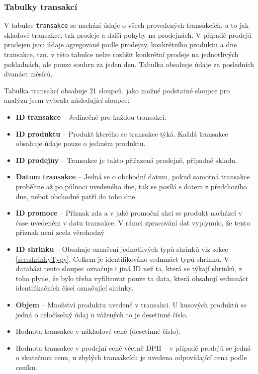 \subsubsection{Tabulky transakcí}
V tabulce \texttt{transakce} se nachází údaje o všech provedených transakcích, a to jak skladové transakce, tak prodeje a další pohyby na prodejnách. V případě prodejů prodejen jsou údaje agregované podle prodejny, konkrétního produktu a dne transakce, tzn. v této tabulce nelze rozlišit konkrétní prodeje na jednotlivých pokladnách, ale pouze souhrn za jeden den. Tabulka obsahuje údaje za posledních dvanáct měsíců.

Tabulka transakcí obsahuje 21 sloupců, jako možné podstatné sloupce pro analýzu jsem vybrala následující sloupce:

\begin{itemize}
    \itemsep0em
    \item \textbf{ID transakce} -- Jedinečné pro každou transakci.
    \item \textbf{ID produktu} -- Produkt kterého se transakce týká. Každá transakce obsahuje údaje pouze o jediném produktu. 
    \item \textbf{ID prodejny} -- Transakce je takto přiřazená prodejně, případně skladu. %
    \item \textbf{Datum transakce} -- Jedná se o obchodní datum, pokud samotná transakce proběhne až po půlnoci uvedeného dne, tak se posílá s datem z předchozího dne, neboť obchodně patří do toho dne.
    \item \textbf{ID promoce} -- Příznak zda a v jaké promoční akci se produkt nacházel v čase uvedeném v datu transakce. V rámci zpracování dat vyplynulo, že tento příznak není zcela věrohodný 
    \item \textbf{ID shrinku} -- Obsahuje označení jednotlivých typů shrinků viz sekce \ref*{sec:shrinkyTypy}. Celkem je identifikováno sedmnáct typů shrinků. V databázi tento sloupec označuje i jiná ID než ta, která se týkají shrinků, z toho plyne, že bylo třeba vyfiltrovat pouze ta data, která obsahují sedmnáct identifikačních čísel označující shrinky. %
    \item \textbf{Objem} -- Množství produktu uvedené v transakci. U kusových produktů se jedná o celočíselný údaj u vážených to je desetinné číslo.
    \item Hodnota transakce v nákladové ceně (desetinné číslo).
    \item Hodnota transakce v prodejní ceně včetně DPH -- v případě prodejů se jedná o skutečnou cenu, u zbylých transakcích je uvedena odpovídající cena podle ceníku.
\end{itemize}

